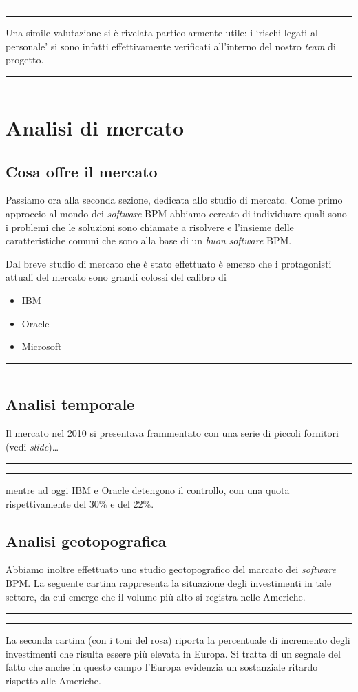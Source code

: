 \documentclass[a4paper,10pt]{article}
\newcommand{\inglese}[1]{\foreignlanguage{english}{\textit{#1}}}
\newcommand{\sw}{\inglese{software}\xspace}
\newcommand{\cambioslide}{%
\begin{center}
\Large
\rule[4pt]{0.2\linewidth}{.7pt} \ding{167} \rule[4pt]{0.2\linewidth}{.7pt}
\end{center}
}
\begin{document}
\cambioslide

Una simile valutazione si è rivelata particolarmente utile: i `rischi legati al personale' si sono infatti effettivamente verificati all'interno del nostro \inglese{team} di progetto.

\cambioslide

\section{Analisi di mercato}

\subsection{Cosa offre il mercato}
Passiamo ora alla seconda sezione, dedicata allo studio di mercato. Come primo approccio al mondo dei \sw BPM abbiamo cercato di individuare quali sono i problemi che le soluzioni sono chiamate a risolvere e l'insieme delle caratteristiche comuni che sono alla base di un \emph{buon} \sw BPM.

Dal breve studio di mercato che è stato effettuato è emerso che i protagonisti attuali del mercato sono grandi colossi del calibro di
\begin{itemize}
  \item IBM
  \item Oracle
  \item Microsoft
\end{itemize}

\cambioslide

\subsection{Analisi temporale}
Il mercato nel 2010 si presentava frammentato con una serie di piccoli fornitori (vedi \inglese{slide})\ldots
\cambioslide
mentre ad oggi IBM e Oracle detengono il controllo, con una quota rispettivamente del 30\% e del 22\%.

\subsection{Analisi geotopografica}
Abbiamo inoltre effettuato uno studio geotopografico del marcato dei \sw BPM\@. La seguente cartina rappresenta la situazione degli investimenti in tale settore, da cui emerge che il volume più alto si registra nelle Americhe.

\cambioslide

La seconda cartina (con i toni del rosa) riporta la percentuale di incremento degli investimenti che risulta essere più elevata in Europa. Si tratta di un segnale del fatto che anche in questo campo l'Europa evidenzia un sostanziale ritardo rispetto alle Americhe.
\end{document}
